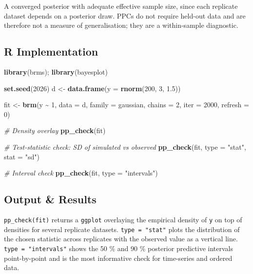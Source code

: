 \documentclass[
]{article}
\newenvironment{Shaded}{\begin{snugshade}}{\end{snugshade}}
\newcommand{\AttributeTok}[1]{\textcolor[rgb]{0.13,0.29,0.53}{#1}}
\newcommand{\CommentTok}[1]{\textcolor[rgb]{0.56,0.35,0.01}{\textit{#1}}}
\newcommand{\DecValTok}[1]{\textcolor[rgb]{0.00,0.00,0.81}{#1}}
\newcommand{\FloatTok}[1]{\textcolor[rgb]{0.00,0.00,0.81}{#1}}
\newcommand{\FunctionTok}[1]{\textcolor[rgb]{0.13,0.29,0.53}{\textbf{#1}}}
\newcommand{\NormalTok}[1]{#1}
\newcommand{\OtherTok}[1]{\textcolor[rgb]{0.56,0.35,0.01}{#1}}
\newcommand{\SpecialCharTok}[1]{\textcolor[rgb]{0.81,0.36,0.00}{\textbf{#1}}}
\newcommand{\StringTok}[1]{\textcolor[rgb]{0.31,0.60,0.02}{#1}}
\begin{document}
A converged posterior with adequate effective sample size, since each
replicate dataset depends on a posterior draw. PPCs do not require
held-out data and are therefore not a measure of generalisation; they
are a within-sample diagnostic.

\subsection{R Implementation}\label{r-implementation}

\begin{Shaded}
\begin{Highlighting}[]
\FunctionTok{library}\NormalTok{(brms); }\FunctionTok{library}\NormalTok{(bayesplot)}

\FunctionTok{set.seed}\NormalTok{(}\DecValTok{2026}\NormalTok{)}
\NormalTok{d }\OtherTok{\textless{}{-}} \FunctionTok{data.frame}\NormalTok{(}\AttributeTok{y =} \FunctionTok{rnorm}\NormalTok{(}\DecValTok{200}\NormalTok{, }\DecValTok{3}\NormalTok{, }\FloatTok{1.5}\NormalTok{))}

\NormalTok{fit }\OtherTok{\textless{}{-}} \FunctionTok{brm}\NormalTok{(y }\SpecialCharTok{\textasciitilde{}} \DecValTok{1}\NormalTok{, }\AttributeTok{data =}\NormalTok{ d, }\AttributeTok{family =}\NormalTok{ gaussian,}
           \AttributeTok{chains =} \DecValTok{2}\NormalTok{, }\AttributeTok{iter =} \DecValTok{2000}\NormalTok{, }\AttributeTok{refresh =} \DecValTok{0}\NormalTok{)}

\CommentTok{\# Density overlay}
\FunctionTok{pp\_check}\NormalTok{(fit)}

\CommentTok{\# Test{-}statistic check: SD of simulated vs observed}
\FunctionTok{pp\_check}\NormalTok{(fit, }\AttributeTok{type =} \StringTok{"stat"}\NormalTok{, }\AttributeTok{stat =} \StringTok{"sd"}\NormalTok{)}

\CommentTok{\# Interval check}
\FunctionTok{pp\_check}\NormalTok{(fit, }\AttributeTok{type =} \StringTok{"intervals"}\NormalTok{)}
\end{Highlighting}
\end{Shaded}

\subsection{Output \& Results}\label{output-results}

\texttt{pp\_check(fit)} returns a \texttt{ggplot} overlaying the
empirical density of \texttt{y} on top of densities for several
replicate datasets. \texttt{type\ =\ "stat"} plots the distribution of
the chosen statistic across replicates with the observed value as a
vertical line. \texttt{type\ =\ "intervals"} shows the 50 \% and 90 \%
posterior predictive intervals point-by-point and is the most
informative check for time-series and ordered data.
\end{document}
